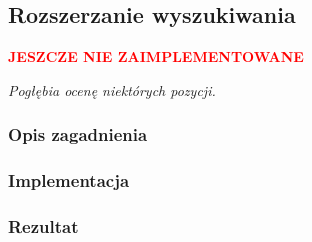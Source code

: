 \subsection{Rozszerzanie wyszukiwania}
\label{subsec:rozszerzanie-wyszukiwania}
\begin{center}
    \textcolor{red}{\textbf{JESZCZE NIE ZAIMPLEMENTOWANE}}
\end{center}
\textit{Pogłębia ocenę niektórych pozycji.}


\subsubsection{Opis zagadnienia}
\subsubsection{Implementacja}
\subsubsection{Rezultat}